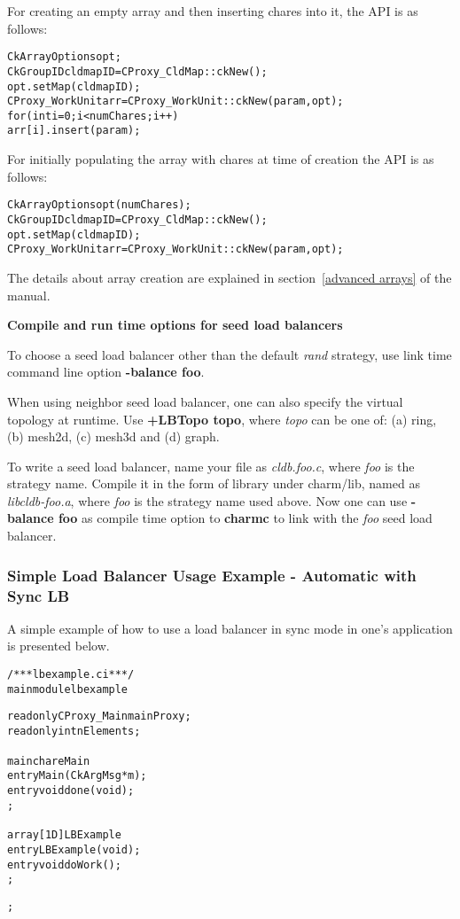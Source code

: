 For creating an empty array and then inserting chares into it, the API is as follows:

\begin{alltt}
  CkArrayOptions opt;
  CkGroupID cldmapID = CProxy_CldMap::ckNew();
  opt.setMap(cldmapID);
  CProxy_WorkUnit arr = CProxy_WorkUnit::ckNew(param, opt); 
  for (int i=0; i<numChares; i++) 
    arr[i].insert(param);
\end{alltt}

For initially populating the array with chares at time of creation the API is as follows:
\begin{alltt}
  CkArrayOptions opt(numChares);
  CkGroupID cldmapID = CProxy_CldMap::ckNew();
  opt.setMap(cldmapID);
  CProxy_WorkUnit arr = CProxy_WorkUnit::ckNew(param, opt); 
\end{alltt}

The details about array creation are explained in section~\ref{advanced arrays} of the manual.

{\bf Compile and run time options for seed load balancers}

To choose a seed load balancer other than the default {\em rand} strategy,
use link time command line option {\bf -balance foo}. 

When using {\rm neighbor} seed load balancer, one can also specify
the virtual topology at runtime. Use {\bf +LBTopo topo}, where {\em topo}
can be one of: (a) ring, (b) mesh2d, (c) mesh3d and (d) graph.

To write a seed load balancer, name your file as {\em cldb.foo.c},
where {\em foo} is the strategy name.  Compile it in the form of library
under charm/lib, named as {\em libcldb-foo.a}, where {\em foo} is the strategy 
name used above. Now one can use {\bf -balance foo} as compile time option
to {\bf charmc} to link with the {\em foo} seed load balancer.

\subsubsection{Simple Load Balancer Usage Example - Automatic with Sync LB}
\label{lbexample}

A simple example of how to use a load balancer in sync mode in one's
application is presented below.

\begin{alltt}
/*** lbexample.ci ***/
mainmodule lbexample {
  readonly CProxy_Main mainProxy;
  readonly int nElements;

  mainchare Main {
    entry Main(CkArgMsg *m);
    entry void done(void);
  };

  array [1D] LBExample {
    entry LBExample(void);
    entry void doWork();
  };
};
\end{alltt}

